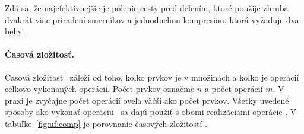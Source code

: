 Zdá sa, že najefektívnejšie je pólenie cesty pred delením, ktoré 
použije zhruba dvakrát viac priradení smerníkov a jednoduchou kompresiou, 
ktorá vyžaduje dva behy \citep{galil}. 

\paragraph{Časová zložitosť.}
Časová zložitosť \uf\ záleží od toho, koľko prvkov je v množinách a koľko je 
operácií celkovo vykonaných operácií. Počet prvkov označme $n$ a počet 
operácií $m$. V praxi je zvyčajne počet operácií oveľa väčší 
ako počet prvkov. Všetky uvedené spôsoby ako vykonať 
operáciu \find\ sa dajú použiť s obomi realizáciami operácie \union. 
V tabuľke~\ref{fig:uf:comp} je porovnanie časových zložitostí \citep{paths2}.

\begin{table}
\centering
\small
\qquad
{}
\caption{\normalsize Porovnanie časových zložitostí pre rôzne kombinácie hľadaní prvkov a 
spájaní množín pre \uf. Počet prvkov je $n$ a počet operácií je $m$. $\alpha$ 
je inverzná ackermannová funkcia. V praxi zväčša platí, že $m > n$.}
\label{fig:uf:comp}
\end{table}


